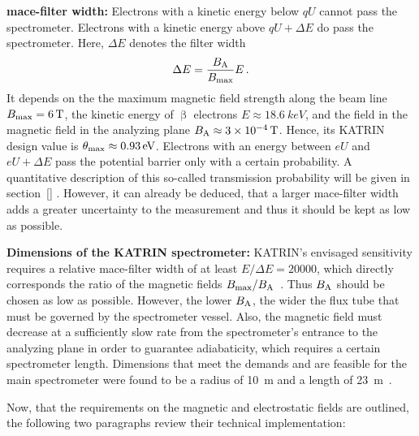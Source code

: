 {\par \textbf{\gls{mace}-filter width:} 
Electrons with a kinetic energy below $qU$ cannot pass the spectrometer. Electrons with a kinetic energy above $qU+\Delta E$ do pass the spectrometer. Here, $\Delta E$ denotes the filter width \cite{Angrik:2005ep}
\begin{equation}
\Delta E = \frac{B_\mathrm{A}}{B_\mathrm{max}} E
\text{\,.}
\end{equation}
It depends on the the maximum magnetic field strength along the beam line $B_\mathrm{max}=\SI{6}{T}$, the kinetic energy of $\upbeta$ electrons $E\approx\SI{18.6}{keV}$, and the field in the magnetic field in the analyzing plane $B_\mathrm{A}\approx\SI{3e-4}{T}$. Hence, its KATRIN design value is $\theta_\mathrm{max}\approx\SI{0.93}{eV}$. Electrons with an energy between $eU$ and $eU+\Delta E$ pass the potential barrier only with a certain probability. A quantitative description of this so-called transmission probability will be given in section~\ref{} . However, it can already be deduced, that a larger \gls{mace}-filter width adds a greater uncertainty to the measurement and thus it should be kept as low as possible.}

{\par \textbf{Dimensions of the KATRIN spectrometer:} KATRIN's envisaged sensitivity requires a relative \gls{mace}-filter width of at least $E/\Delta E = 20000$, which directly corresponds the ratio of the magnetic fields $B_\mathrm{max}/B_\mathrm{A}$~\cite{Angrik:2005ep}. Thus $B_\mathrm{A}$ should be chosen as low as possible. However, the lower $B_\mathrm{A}$, the wider the flux tube that must be governed by the spectrometer vessel. Also, the magnetic field must decrease at a sufficiently slow rate from the spectrometer's entrance to the analyzing plane in order to guarantee adiabaticity, which requires a certain spectrometer length. Dimensions that meet the demands and are feasible for the main spectrometer were found to be a radius of \SI{10}{m} and a length of \SI{23}{m}~\cite{Angrik:2005ep, Valerius2009}.}

Now, that the requirements on the magnetic and electrostatic fields are outlined, the following two paragraphs review their technical implementation:

